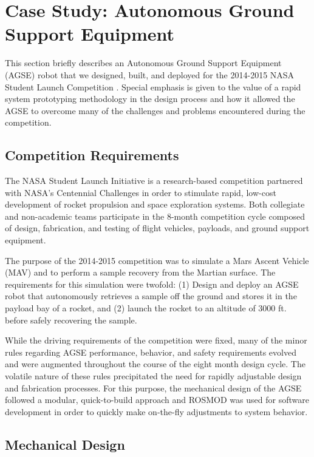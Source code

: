 \section{Case Study: Autonomous Ground Support Equipment}
\label{sec:Case_Study}

This section briefly describes an Autonomous Ground Support Equipment (AGSE) robot that we designed, built, and deployed for the 2014-2015 NASA Student Launch Competition \cite{NASA_SL}. Special emphasis is given to the value of a rapid system prototyping methodology in the design process and how it allowed the AGSE to overcome many of the challenges and problems encountered during the competition.

\subsection{Competition Requirements}

The NASA Student Launch Initiative \cite{NASA_SL} is a research-based competition partnered with NASA's Centennial Challenges in order to stimulate rapid, low-cost development of rocket propulsion and space exploration systems.  Both collegiate and non-academic teams participate in the 8-month competition cycle composed of design, fabrication, and testing of flight vehicles, payloads, and ground support equipment. 

The purpose of the 2014-2015 competition was to simulate a Mars Ascent Vehicle (MAV) and to perform a sample recovery from the Martian surface. The requirements for this simulation were twofold: (1) Design and deploy an AGSE robot that autonomously retrieves a sample off the ground and stores it in the payload bay of a rocket, and (2) launch the rocket to an altitude of 3000 ft. before safely recovering the sample. 

While the driving requirements of the competition were fixed, many of the minor rules regarding AGSE performance, behavior, and safety requirements evolved and were augmented throughout the course of the eight month design cycle. The volatile nature of these rules precipitated the need for rapidly adjustable design and fabrication processes. For this purpose, the mechanical design of the AGSE followed a modular, quick-to-build approach and ROSMOD was used for software development in order to quickly make on-the-fly adjustments to system behavior.

\subsection{Mechanical Design}

